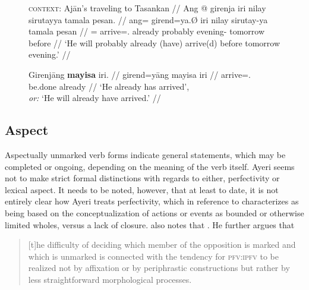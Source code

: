 \begin{figure}[h]
\ex\label{ex:futperf}
\begingl
	\glpreamble \textsc{context}: Ajān's traveling to Tasankan //
	\gla Ang @ girenja iri nilay sirutayya tamala pesan. //
	\glb ang= girend=ya.Ø iri nilay sirutay-ya tamala pesan //
	\glc \AgtT{}= arrive=\TsgM{}.\Top{} already probably evening-\Loc{}
		tomorrow before //
	\glft `He will probably already (have) arrive(d) before 
		tomorrow evening.' //
\endgl
\xe
\end{figure}

\begin{figure}[h]
\ex\label{ex:futlexpfv}
\begingl
	\gla Girenjāng \textbf{mayisa} iri. //
	\glb girend=yāng mayisa iri //
	\glc arrive=\TsgM{}.\Aarg{} be.done already //
	\glft `He already has arrived', \\
		\textit{or:} `He will already have arrived.' //
\endgl
\xe
\end{figure}



\subsection{Aspect}
\label{subsec:aspect}

Aspectually unmarked verb forms indicate general statements, which may be
completed or ongoing, depending on the meaning of the verb itself. Ayeri seems
not to make strict formal distinctions with regards to either, perfectivity or
lexical aspect. It needs to be noted, however, that at least to date, it is not
entirely clear how Ayeri treats perfectivity, which \citet[76]{dahl1985} in
reference to \citet[16]{comrie1976} characterizes as being based on the
conceptualization of actions or events as bounded or otherwise limited wholes,
versus a lack of closure. \citet{dahl1985} also notes that
. He further argues that

\blockcquote[73]{dahl1985}{[t]he difficulty of deciding which member of the
opposition is marked and which is unmarked is connected with the tendency for
\textsc{pfv:ipfv} to be realized not by affixation or by periphrastic
constructions but rather by less straightforward morphological processes.}


